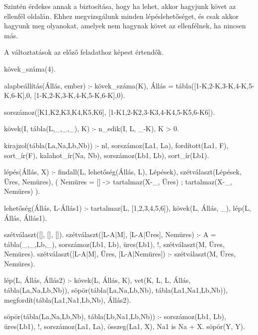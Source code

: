 Szintén érdekes annak a biztosítása, hogy ha lehet,
akkor hagyjunk követ az ellenfél oldalán. Ehhez
megvizsgálunk minden lépéslehetőséget, és csak akkor
hagyunk meg olyanokat, amelyek nem hagynak követ
az ellenfélnek, ha nincsen más.

A változtatások az előző feladathoz képest értendők.
\begin{program}
kövek_száma(4).

alapbeállítás(Állás, ember) :-
    kövek_száma(K),
    Állás = tábla([1-K,2-K,3-K,4-K,5-K,6-K],0,
                  [1-K,2-K,3-K,4-K,5-K,6-K],0).

sorszámoz([K1,K2,K3,K4,K5,K6],
          [1-K1,2-K2,3-K3,4-K4,5-K5,6-K6]).

kövek(I, tábla(L,_,_,_), K) :-
    n_edik(I, L, _-K), K > 0.

kirajzol(tábla(La,Na,Lb,Nb)) :-
    nl,
    sorszámoz(La1, La),
    fordított(La1, F),
    sort_ír(F),
    kalahot_ír(Na, Nb),
    sorszámoz(Lb1, Lb),
    sort_ír(Lb1).

lépés(Állás, X) :-
   findall(L, lehetőség(Állás, L), Lépések),
   szétválaszt(Lépések, Üres, Nemüres),
   ( Nemüres = [] -> tartalmaz(X-_, Üres)
   ; tartalmaz(X-_, Nemüres)
   ).

lehetőség(Állás, L-Állás1) :-
    tartalmaz(L, [1,2,3,4,5,6]),
    kövek(L, Állás, _),
    lép(L, Állás, Állás1).

szétválaszt([], [], []).
szétválaszt([L-A|M], [L-A|Üres], Nemüres) :-
    A = tábla(_,_,Lb,_), sorszámoz(Lb1, Lb),
    üres(Lb1), !,
    szétválaszt(M, Üres, Nemüres).
szétválaszt([L-A|M], Üres, [L-A|Nemüres]) :-
    szétválaszt(M, Üres, Nemüres).

lép(L, Állás, Állás2) :- 
    kövek(L, Állás, K),
    vet(K, L, L, Állás, tábla(La,Na,Lb,Nb)),
    söpör(tábla(La,Na,Lb,Nb), tábla(La1,Na1,Lb,Nb)),
    megfordít(tábla(La1,Na1,Lb,Nb), Állás2).  

söpör(tábla(La,Na,Lb,Nb), tábla(Lb,Na1,Lb,Nb)) :-
    sorszámoz(Lb1, Lb),
    üres(Lb1), !,
    sorszámoz(La1, La),
    összeg(La1, X),
    Na1 is Na + X.
söpör(Y, Y).


\end{program}
